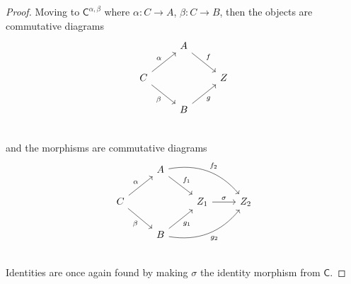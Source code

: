 \documentclass{article}
\theoremstyle{definition}
\begin{document}
\begin{proof}
	Moving to $\mathsf{C}^{\alpha, \beta}$ where $\alpha: C \to A$, $\beta: C \to B$, then the objects are commutative diagrams \begin{equation*}
		\begin{tikzcd}
      & A \arrow[dr, "f"] \\
      C \arrow[ur, "\alpha"] \arrow[dr, "\beta"'] & & Z \\
      & B \arrow[ur, "g"'] \\
		\end{tikzcd}
	\end{equation*}
  and the morphisms are commutative diagrams \begin{equation*}
    \begin{tikzcd}
      & A \arrow[dr, "f_1"] \arrow[drr, bend left, "f_2"] \\
      C \arrow[ur, "\alpha"] \arrow[dr, "\beta"'] & & Z_1 \arrow[r, "\sigma"] & Z_2 \\
      & B \arrow[ur, "g_1"'] \arrow[urr, bend right, "g_2"']\\
    \end{tikzcd}
  \end{equation*}
  Identities are once again found by making $\sigma$ the identity morphism from $\mathsf{C}$.
\end{proof}
\end{document}
